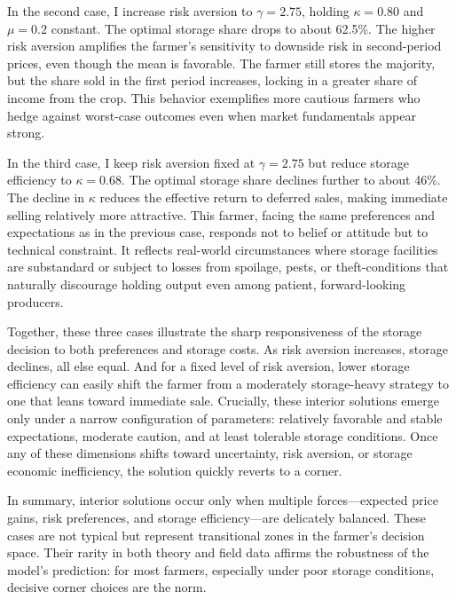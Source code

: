 In the second case, I increase risk aversion to $\gamma = 2.75$, holding $\kappa = 0.80$ and $\mu = 0.2$ constant. The optimal storage share drops to about 62.5\%. The higher risk aversion amplifies the farmer's sensitivity to downside risk in second-period prices, even though the mean is favorable. The farmer still stores the majority, but the share sold in the first period increases, locking in a greater share of income from the crop. This behavior exemplifies more cautious farmers who hedge against worst-case outcomes even when market fundamentals appear strong.

In the third case, I keep risk aversion fixed at $\gamma = 2.75$ but reduce storage efficiency to $\kappa = 0.68$. The optimal storage share declines further to about 46\%. The decline in $\kappa$ reduces the effective return to deferred sales, making immediate selling relatively more attractive. This farmer, facing the same preferences and expectations as in the previous case, responds not to belief or attitude but to technical constraint. It reflects real-world circumstances where storage facilities are substandard or subject to losses from spoilage, pests, or theft-conditions that naturally discourage holding output even among patient, forward-looking producers.

Together, these three cases illustrate the sharp responsiveness of the storage decision to both preferences and storage costs. As risk aversion increases, storage declines, all else equal. And for a fixed level of risk aversion, lower storage efficiency can easily shift the farmer from a moderately storage-heavy strategy to one that leans toward immediate sale. Crucially, these interior solutions emerge only under a narrow configuration of parameters: relatively favorable and stable expectations, moderate caution, and at least tolerable storage conditions. Once any of these dimensions shifts toward uncertainty, risk aversion, or storage economic inefficiency, the solution quickly reverts to a corner.

In summary, interior solutions occur only when multiple forces---expected price gains, risk preferences, and storage efficiency---are delicately balanced. These cases are not typical but represent transitional zones in the farmer's decision space. Their rarity in both theory and field data affirms the robustness of the model's prediction: for most farmers, especially under poor storage conditions, decisive corner choices are the norm.




